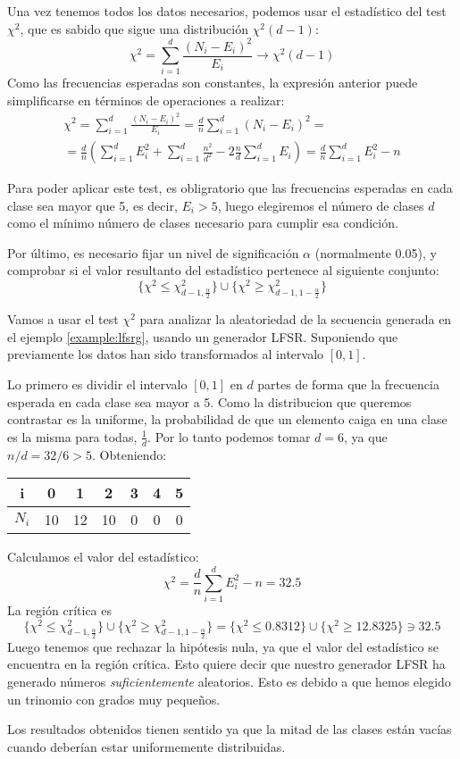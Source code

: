 Una vez tenemos todos los datos necesarios, podemos usar el estadístico del test $\chi^2$, que es sabido que sigue una distribución $\chi^2(d-1)$:
\[
\chi^2=\sum_{i=1}^d\frac{(N_i-E_i)^2}{E_i} \longrightarrow \chi^2(d-1)
\]
Como las frecuencias esperadas son constantes, la expresión anterior puede simplificarse en términos de operaciones a realizar:
\begin{multline}
\chi^2=\sum_{i=1}^d\frac{(N_i-E_i)^2}{E_i}=\frac{d}{n}\sum_{i=1}^d(N_i-E_i)^2= \\
=\frac{d}{n}\left(\sum_{i=1}^dE_i^2+\sum_{i=1}^d\frac{n^2}{d^2}-2\frac{n}{d}\sum_{i=1}^dE_i\right)=\frac{d}{n}\sum_{i=1}^dE_i^2-n
\end{multline}

Para poder aplicar este test, es obligratorio que las frecuencias esperadas en cada clase sea mayor que 5, es decir, $E_i>5$, luego elegiremos el número de clases $d$ como el mínimo número de clases necesario para cumplir esa condición.

Por último, es necesario fijar un nivel de significación $\alpha$ (normalmente  0.05), y comprobar si el valor resultanto del estadístico pertenece al siguiente conjunto:
\[
\{\chi^2\leq \chi^2_{d-1,\frac{\alpha}{2}}\}\cup\{\chi^2\geq \chi^2_{d-1,1-\frac{\alpha}{2}}\}
\]

\begin{example}
Vamos a usar el test $\chi^2$ para analizar la aleatoriedad de la secuencia generada en el ejemplo \ref{example:lfsrg}, usando un generador LFSR. Suponiendo que previamente los datos han sido transformados al intervalo $[0,1]$.

Lo primero es dividir el intervalo $[0,1]$ en $d$ partes de forma que la frecuencia esperada en cada clase sea mayor a 5. Como la distribucion que queremos contrastar es la uniforme, la probabilidad de que un elemento caiga en una clase es la misma para todas, $\frac{1}{d}$. Por lo tanto podemos tomar $d=6$, ya que $n/d=32/6>5$. Obteniendo:

\begin{center}
\begin{tabular}{c|cccccc}
i & 0 & 1 & 2 & 3 & 4 & 5 \\ 
\hline 
$N_i$ & 10 & 12 & 10 & 0 & 0 & 0 \\ 
\end{tabular} 
\end{center}
Calculamos el valor del estadístico:
\[
\chi^2=\frac{d}{n}\sum_{i=1}^dE_i^2-n=32.5
\]
La región crítica es 
\[
\{\chi^2\leq \chi^2_{d-1,\frac{\alpha}{2}}\}\cup\{\chi^2\geq \chi^2_{d-1,1-\frac{\alpha}{2}}\}=
\{\chi^2\leq 0.8312 \}\cup\{\chi^2\geq 12.8325 \}\ni 32.5
\]
Luego tenemos que rechazar la hipótesis nula, ya que el valor del estadístico se encuentra en la región crítica. Esto quiere decir que nuestro generador LFSR ha generado números \textit{suficientemente} aleatorios. Esto es debido a que hemos elegido un trinomio con grados muy pequeños.

Los resultados obtenidos tienen sentido ya que la mitad de las clases están vacías cuando deberían estar uniformemente distribuidas.

\end{example}